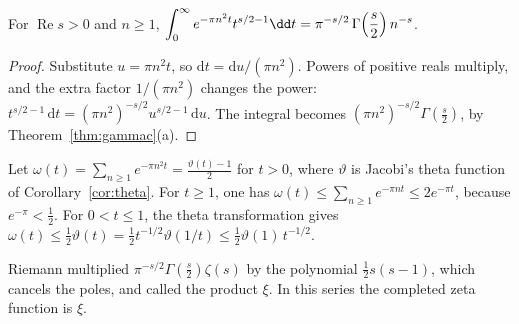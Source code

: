 
\begin{lemma}\label{lem:mellingauss}
For $\operatorname{Re}s>0$ and $n\ge1$, $\displaystyle\int_0^\infty e^{-\pi n^2t}t^{s/2-1}\dd t=\pi^{-s/2}\,\Gamma\Bigl(\frac s2\Bigr)\,n^{-s}$.
\end{lemma}
\begin{proof}
Substitute $u=\pi n^2t$, so $\mathrm dt=\mathrm du/(\pi n^2)$. Powers of positive reals multiply, and the extra factor $1/(\pi n^2)$ changes the power: $t^{s/2-1}\,\mathrm dt=(\pi n^2)^{-s/2}u^{s/2-1}\,\mathrm du$. The integral becomes $(\pi n^2)^{-s/2}\Gamma(\frac s2)$, by Theorem~\ref{thm:gammac}(a).
\end{proof}

Let $\omega(t)=\sum_{n\ge1}e^{-\pi n^2t}=\frac{\vartheta(t)-1}2$ for $t>0$, where $\vartheta$ is Jacobi's theta function of Corollary~\ref{cor:theta}. For $t\ge1$, one has $\omega(t)\le\sum_{n\ge1}e^{-\pi nt}\le2e^{-\pi t}$, because $e^{-\pi}<\frac12$. For $0<t\le1$, the theta transformation gives $\omega(t)\le\frac12\vartheta(t)=\frac12 t^{-1/2}\vartheta(1/t)\le\frac12\vartheta(1)\,t^{-1/2}$.

Riemann multiplied $\pi^{-s/2}\Gamma(\frac s2)\zeta(s)$ by the polynomial $\frac12 s(s-1)$, which cancels the poles, and called the product $\xi$. In this series the completed zeta function is $\xi$.

